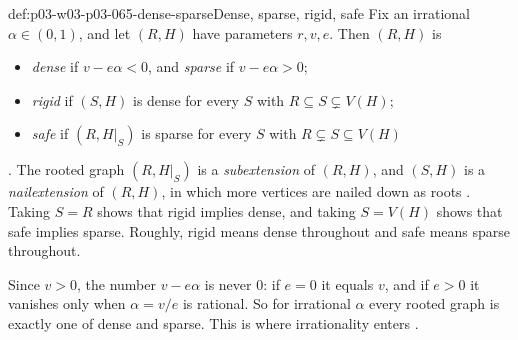 \begin{hbdefinition}{def:p03-w03-p03-065-dense-sparse}{Dense, sparse, rigid, safe}
Fix an irrational \(\alpha\in(0,1)\), and let \((R,H)\) have parameters
\(r,v,e\).  Then \((R,H)\) is
\begin{itemize}
\item \emph{dense} if \(v-e\alpha<0\), and \emph{sparse} if \(v-e\alpha>0\);
\item \emph{rigid} if \((S,H)\) is dense for every \(S\) with
\(R\subseteq S\subsetneq V(H)\);
\item \emph{safe} if \((R,H|_S)\) is sparse for every \(S\) with
\(R\subsetneq S\subseteq V(H)\)
\end{itemize}
\cite[p.~6]{Spencer2007LogicRandomStructuresAuthor}.  The rooted graph \((R,H|_S)\) is a
\emph{subextension} of \((R,H)\), and \((S,H)\) is a \emph{nailextension}
of \((R,H)\), in which more vertices are nailed down as roots
\cite[p.~7]{Spencer2007LogicRandomStructuresAuthor}.  Taking \(S=R\) shows that rigid
implies dense, and taking \(S=V(H)\) shows that safe implies sparse.
Roughly, rigid means dense throughout and safe means sparse throughout.
\end{hbdefinition}

Since \(v>0\), the number \(v-e\alpha\) is never \(0\): if \(e=0\) it equals
\(v\), and if \(e>0\) it vanishes only when \(\alpha=v/e\) is rational.  So
for irrational \(\alpha\) every rooted graph is exactly one of dense and
sparse.  This is where irrationality enters \cite[p.~6]{Spencer2007LogicRandomStructuresAuthor}.

